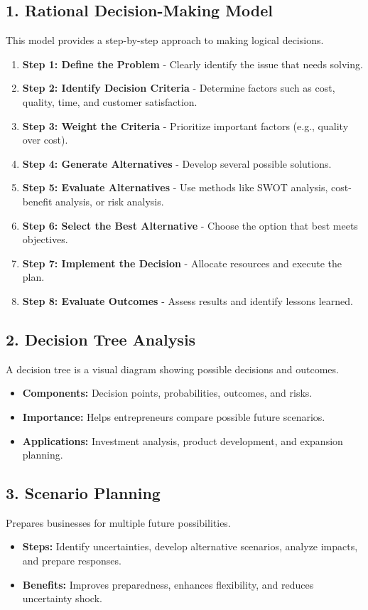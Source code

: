 \documentclass[12pt,a4paper]{article}
\begin{document}
\subsection*{1. Rational Decision-Making Model}
This model provides a step-by-step approach to making logical decisions.
\begin{enumerate}
    \item \textbf{Step 1: Define the Problem} - Clearly identify the issue that needs solving.
    \item \textbf{Step 2: Identify Decision Criteria} - Determine factors such as cost, quality, time, and customer satisfaction.
    \item \textbf{Step 3: Weight the Criteria} - Prioritize important factors (e.g., quality over cost).
    \item \textbf{Step 4: Generate Alternatives} - Develop several possible solutions.
    \item \textbf{Step 5: Evaluate Alternatives} - Use methods like SWOT analysis, cost-benefit analysis, or risk analysis.
    \item \textbf{Step 6: Select the Best Alternative} - Choose the option that best meets objectives.
    \item \textbf{Step 7: Implement the Decision} - Allocate resources and execute the plan.
    \item \textbf{Step 8: Evaluate Outcomes} - Assess results and identify lessons learned.
\end{enumerate}

\subsection*{2. Decision Tree Analysis}
A decision tree is a visual diagram showing possible decisions and outcomes.
\begin{itemize}
    \item \textbf{Components:} Decision points, probabilities, outcomes, and risks.
    \item \textbf{Importance:} Helps entrepreneurs compare possible future scenarios.
    \item \textbf{Applications:} Investment analysis, product development, and expansion planning.
\end{itemize}

\subsection*{3. Scenario Planning}
Prepares businesses for multiple future possibilities.
\begin{itemize}
    \item \textbf{Steps:} Identify uncertainties, develop alternative scenarios, analyze impacts, and prepare responses.
    \item \textbf{Benefits:} Improves preparedness, enhances flexibility, and reduces uncertainty shock.
\end{itemize}
\end{document}
